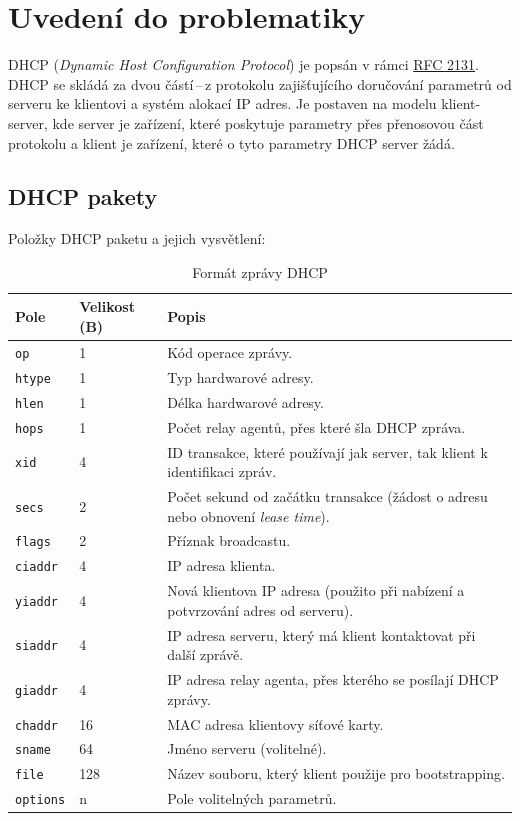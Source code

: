 \documentclass[a4paper, 11pt, hidelinks]{article}
\begin{document}
\newpage
\section{Uvedení do problematiky}\label{1_problematika}
DHCP (\emph{Dynamic Host Configuration Protocol}) je popsán v rámci \href{https://datatracker.ietf.org/doc/html/rfc2131}{RFC 2131}. 
DHCP se skládá za dvou částí\,--\,z protokolu zajišťujícího doručování parametrů od serveru ke klientovi a systém alokací IP adres.
Je postaven na modelu klient-server, kde server je zařízení, které poskytuje parametry přes přenosovou část protokolu a klient je zařízení, které o tyto parametry DHCP server žádá.

\subsection{DHCP pakety}\label{1_1_pakety}
Položky DHCP paketu a jejich vysvětlení:
\begin{table}[ht]
  \centering
  \begin{tabularx}{\textwidth}{p{}p{}p{}}
    \toprule
    \textbf{Pole} & \textbf{Velikost (B)} & \textbf{Popis} \\
    \midrule
    \texttt{op} & 1 & Kód operace zprávy. \\
    \texttt{htype} & 1 & Typ hardwarové adresy. \\
    \texttt{hlen} & 1 & Délka hardwarové adresy. \\
    \texttt{hops} & 1 & Počet relay agentů\footnotemark[2], přes které šla DHCP zpráva. \\
    \texttt{xid} & 4 & ID transakce, které používají jak server, tak klient k identifikaci zpráv. \\
    \texttt{secs} & 2 & Počet sekund od začátku transakce (žádost o adresu nebo obnovení \emph{lease time}). \\
    \texttt{flags} & 2 & Příznak broadcastu. \\
    \texttt{ciaddr} & 4 & IP adresa klienta. \\
    \texttt{yiaddr} & 4 & Nová klientova IP adresa (použito při nabízení a potvrzování adres od serveru). \\
    \texttt{siaddr} & 4 & IP adresa serveru, který má klient kontaktovat při další zprávě. \\
    \texttt{giaddr} & 4 & IP adresa relay agenta, přes kterého se posílají DHCP zprávy. \\
    \texttt{chaddr} & 16 & MAC adresa klientovy síťové karty. \\
    \texttt{sname} & 64 & Jméno serveru (volitelné). \\
    \texttt{file} & 128 & Název souboru, který klient použije pro bootstrapping\footnotemark[3]. \\
    \texttt{options} & n & Pole volitelných parametrů.\\
    \bottomrule
  \end{tabularx}
  \label{tab:dhcp-format}
  \caption{Formát zprávy DHCP}
\end{table}
\end{document}
